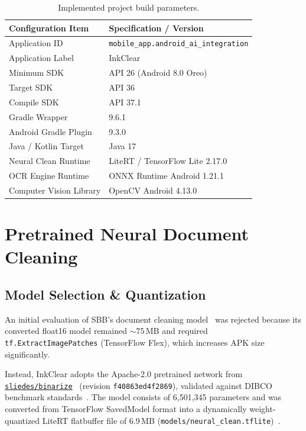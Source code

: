 \documentclass[11pt,a4paper]{article}
\begin{document}
\begin{table}[h]
\centering
\begin{tabular}{ll}
\toprule
\textbf{Configuration Item} & \textbf{Specification / Version} \\
\midrule
Application ID & \texttt{mobile\_app.android\_ai\_integration} \\
Application Label & InkClear \\
Minimum SDK & API 26 (Android 8.0 Oreo) \\
Target SDK & API 36 \\
Compile SDK & API 37.1 \\
Gradle Wrapper & 9.6.1 \\
Android Gradle Plugin & 9.3.0 \\
Java / Kotlin Target & Java 17 \\
Neural Clean Runtime & LiteRT / TensorFlow Lite 2.17.0~\cite{david2021tflite} \\
OCR Engine Runtime & ONNX Runtime Android 1.21.1~\cite{onnxruntime2021} \\
Computer Vision Library & OpenCV Android 4.13.0~\cite{bradski2000opencv} \\
\bottomrule
\end{tabular}
\caption{Implemented project build parameters.}
\label{tab:config}
\end{table}

\section{Pretrained Neural Document Cleaning}

\subsection{Model Selection \& Quantization}
An initial evaluation of SBB's document cleaning model~\cite{kicker2019sbb} was rejected because its converted float16 model remained $\sim 75\,\text{MB}$ and required \texttt{tf.ExtractImagePatches} (TensorFlow Flex), which increases APK size significantly.

Instead, InkClear adopts the Apache-2.0 pretrained network from \href{https://github.com/sliedes/binarize}{\texttt{sliedes/binarize}}~\cite{sliedes2021binarize} (revision \texttt{f40863ed4f2869}), validated against DIBCO benchmark standards~\cite{pratikakis2009icdar}. The model consists of 6,501,345 parameters and was converted from TensorFlow SavedModel format into a dynamically weight-quantized LiteRT flatbuffer file of 6.9\,MB (\texttt{models/neural\_clean.tflite})~\cite{david2021tflite}.
\end{document}
